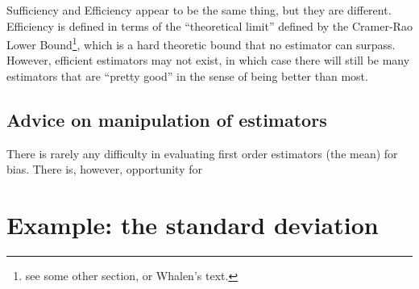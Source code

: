 Sufficiency and Efficiency appear to be the same thing, but they are
different.  Efficiency is defined in terms of the ``theoretical
limit'' defined by the Cramer-Rao Lower Bound\footnote{see some other
section, or Whalen's text.}, which is a hard theoretic bound that no
estimator can surpass.  However, efficient estimators may not exist,
in which case there will still be many estimators that are ``pretty
good'' in the sense of being better than most.

\subsection{Advice on manipulation of estimators}

There is rarely any difficulty in evaluating first order estimators
(the mean) for bias.  There is, however, opportunity for 


\section{Example: the standard deviation}

